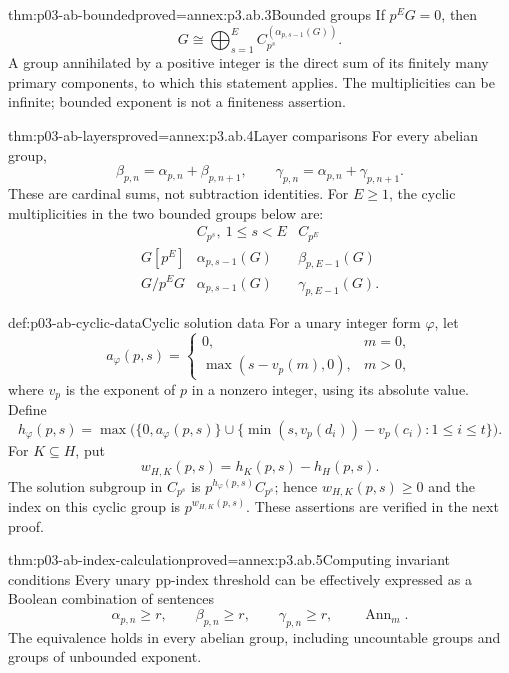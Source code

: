 \begin{hblemma}{thm:p03-ab-bounded}{proved=annex:p3.ab.3}{Bounded groups}
If \(p^E G=0\), then
\[
 G\cong\bigoplus_{s=1}^{E}
             C_{p^s}^{(\alpha_{p,s-1}(G))}.
\]
A group annihilated by a positive integer is the direct sum of its
finitely many primary components, to which this statement applies.
The multiplicities can be infinite; bounded exponent is not a
finiteness assertion.
\end{hblemma}

\begin{hblemma}{thm:p03-ab-layers}{proved=annex:p3.ab.4}{Layer comparisons}
For every abelian group,
\[
 \beta_{p,n}=\alpha_{p,n}+\beta_{p,n+1},
 \qquad
 \gamma_{p,n}=\alpha_{p,n}+\gamma_{p,n+1}.
\]
These are cardinal sums, not subtraction identities. For \(E\geq1\),
the cyclic multiplicities in the two bounded groups below are:
\[
 \begin{array}{c|c|c}
 &C_{p^s},\ 1\leq s<E&C_{p^E}\\ \hline
 G[p^E]&\alpha_{p,s-1}(G)&\beta_{p,E-1}(G)\\
 G/p^EG&\alpha_{p,s-1}(G)&\gamma_{p,E-1}(G).
 \end{array}
\]
\end{hblemma}

\begin{hbdefinition}{def:p03-ab-cyclic-data}{Cyclic solution data}
For a unary integer form \(\varphi\), let
\[
 a_\varphi(p,s)=
 \begin{cases}
 0,&m=0,\\
 \max(s-v_p(m),0),&m>0,
 \end{cases}
\]
where \(v_p\) is the exponent of \(p\) in a nonzero integer, using its
absolute value. Define
\[
 h_\varphi(p,s)=
 \max\bigl(\{0,a_\varphi(p,s)\}
       \cup\{\min(s,v_p(d_i))-v_p(c_i):1\leq i\leq t\}\bigr).
\]
For \(K\subseteq H\), put
\[
 w_{H,K}(p,s)=h_K(p,s)-h_H(p,s).
\]
The solution subgroup in \(C_{p^s}\) is \(p^{h_\varphi(p,s)}C_{p^s}\);
hence \(w_{H,K}(p,s)\geq0\) and the index on this cyclic group is
\(p^{w_{H,K}(p,s)}\). These assertions are verified in the next proof.
\end{hbdefinition}

\begin{hbtheorem}{thm:p03-ab-index-calculation}{proved=annex:p3.ab.5}{Computing invariant conditions}
Every unary pp-index threshold can be effectively expressed as a Boolean
combination of sentences
\[
 \alpha_{p,n}\geq r,\qquad
 \beta_{p,n}\geq r,\qquad
 \gamma_{p,n}\geq r,\qquad
 \operatorname{Ann}_m.
\]
The equivalence holds in every abelian group, including uncountable
groups and groups of unbounded exponent.
\end{hbtheorem}

